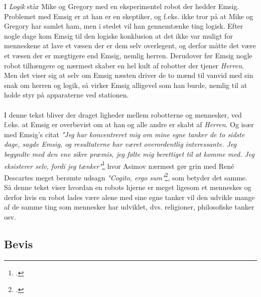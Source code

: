 I \textit{Logik} står Mike og Gregory med en eksperimentel robot der hedder Emsig. Problemet med Emsig er at han er en skeptiker, og f.eks. ikke tror på at Mike og Gregory
har samlet ham, men i stedet vil han gennemtænke ting logisk. Efter nogle dage kom Emsig til den logiske konklusion at det ikke var muligt for menneskene at lave et væsen
der er dem selv overlegent, og derfor måtte det være et væsen der er mægtigere end Emsig, nemlig herren. Derudover før Emsig nogle robot tilhængere og nærmest skaber
en hel kult af robotter der tjener \textit{Herren}. Men det viser sig at selv om Emsig næsten driver de to mænd til vanvid med sin snak om herren og logik, så virker
Emsig alligevel som han burde, nemlig til at holde styr på apparaterne ved stationen.
\\
\\
I denne tekst bliver der draget ligheder mellem robotterne og mennesker, ved f.eks. at Emsig er overbevist om at han og alle andre er skabt af \textit{Herren}.
Og især med Emsig's citat \textit{"Jeg har koncentreret mig om mine egne tanker de to sidste dage, sagde Emsig, og resultaterne har været overordentlig
interessante. Jeg begyndte med den ene sikre præmis, jeg følte mig berettiget til at komme med. Jeg eksisterer selv, fordi jeg tænker"}\footcite[62, l. 25]{robot} hvor Asimov nærmest
gør grin med René Descartes meget berømte udsagn \textit{"Cogito, ergo sum"}\footcite{rene}, som betyder det samme. Så denne tekst viser hvordan en robots hjerne er meget ligesom et menneskes og derfor
hvis en robot lades være alene med sine egne tanker vil den udvikle mange af de samme ting som mennesker har udviklet, dvs. religioner, philosofiske tanker osv.

\subsection{Bevis}

